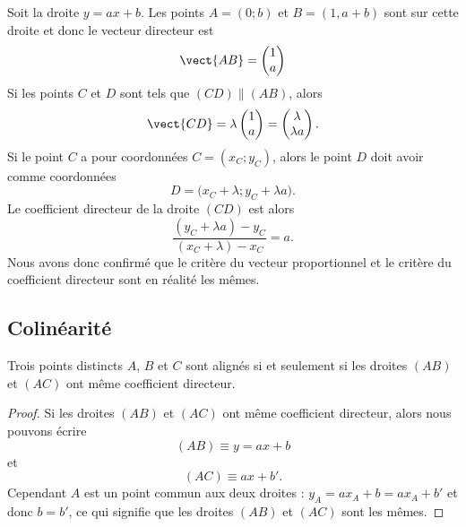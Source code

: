 Soit la droite \( y=ax+b\). Les points \( A=(0;b)\) et \( B=(1,a+b)\) sont sur cette droite et donc le vecteur directeur est
\begin{equation}
    \vect{ AB }=\begin{pmatrix}
        1    \\ 
        a    
    \end{pmatrix}
\end{equation}
Si les points \( C\) et \( D\) sont tels que \( (CD)\parallel (AB)\), alors
\begin{equation}
    \vect{ CD }=\lambda\begin{pmatrix}
        1    \\ 
        a    
    \end{pmatrix}=\begin{pmatrix}
        \lambda    \\ 
            \lambda a
    \end{pmatrix}.
\end{equation}
Si le point \( C\) a pour coordonnées \( C=(x_C;y_C)\), alors le point \( D\) doit avoir comme coordonnées
\begin{equation}
    D=\big( x_C+\lambda;y_C+\lambda a \big).
\end{equation}
Le coefficient directeur de la droite \( (CD)\) est alors
\begin{equation}
    \frac{ (y_C+\lambda a)-y_C }{ (x_C+\lambda)-x_C }=a.
\end{equation}
Nous avons donc confirmé que le critère du vecteur proportionnel et le critère du coefficient directeur sont en réalité les mêmes.

\subsection{Colinéarité}

\begin{theorem}
    Trois points distincts \( A\), \( B\) et \( C\) sont alignés si et seulement si les droites \( (AB)\) et \( (AC)\) ont même coefficient directeur.
\end{theorem}

\begin{proof}
    Si les droites \( (AB)\) et \( (AC)\) ont même coefficient directeur, alors nous pouvons écrire
    \begin{equation}
        (AB)\equiv y=ax+b
    \end{equation}
    et
    \begin{equation}
        (AC)\equiv ax+b'.
    \end{equation}
    Cependant \( A\) est un point commun aux deux droites : \( y_A=ax_A+b=ax_A+b'\) et donc \( b=b'\), ce qui signifie que les droites \( (AB)\) et \( (AC)\) sont les mêmes.
\end{proof}

